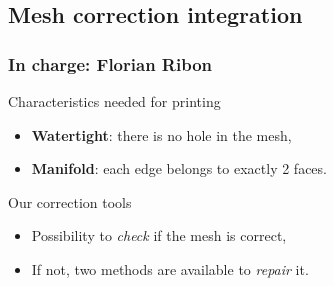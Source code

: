 \documentclass{beamer}
\begin{document}
\subsection{Mesh correction integration}

\begin{frame}
	\frametitle{In charge: Florian Ribon}
    \begin{block}{Characteristics needed for printing}
		\begin{itemize}
		    \item \textbf{Watertight}: there is no hole in the mesh,
            \item \textbf{Manifold}: each edge belongs to exactly 2 faces.
		\end{itemize}
    \end{block}

    \begin{block}{Our correction tools}
		\begin{itemize}
		    \item Possibility to \textit{check} if the mesh is correct,
			\item If not, two methods are available to \textit{repair} it.
		\end{itemize}
    \end{block}

\end{frame}
\end{document}
